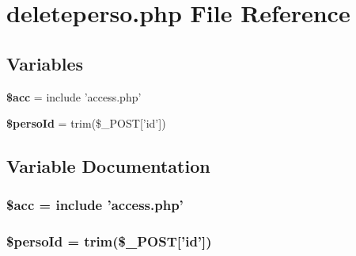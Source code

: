 \section{deleteperso.php File Reference}
\label{deleteperso_8php}


\subsection*{Variables}
\begin{CompactItemize}
\item 
{\bf \$acc} = include 'access.php'
\item 
{\bf \$perso\-Id} = trim(\$\_\-POST['id'])
\end{CompactItemize}


\subsection{Variable Documentation}
\subsubsection{\setlength{\rightskip}{0pt plus 5cm}\$acc = include 'access.php'}\label{deleteperso_8php_542926c588a05eb69553d79c83cf73da}


\subsubsection{\setlength{\rightskip}{0pt plus 5cm}\$perso\-Id = trim(\$\_\-POST['id'])}\label{deleteperso_8php_2369d5f79f5a5a70747edb815cc2ddeb}



